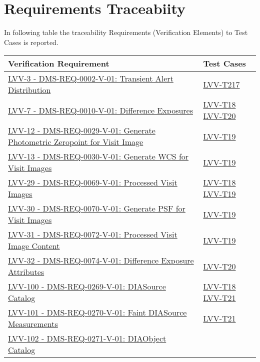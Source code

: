 \section{Requirements Traceabiity}\label{requirements-traceability}

In following table the traceability Requirements (Verification Elements) to Test Cases is reported.

\scriptsize{\begin{longtable}[]{p{13cm}p{3cm}}
\toprule 
Verification Requirement & Test Cases\tabularnewline
\midrule
\endhead \href{https://jira.lsstcorp.org/browse/LVV-3}{ LVV-3 - DMS-REQ-0002-V-01: Transient Alert Distribution } & 
{ \hyperref[lvv-t217]{LVV-T217}} \\ 
 \href{https://jira.lsstcorp.org/browse/LVV-7}{ LVV-7 - DMS-REQ-0010-V-01: Difference Exposures } & 
{ \hyperref[lvv-t18]{LVV-T18} \hyperref[lvv-t20]{LVV-T20}} \\ 
 \href{https://jira.lsstcorp.org/browse/LVV-12}{ LVV-12 - DMS-REQ-0029-V-01: Generate Photometric Zeropoint for Visit Image } & 
{ \hyperref[lvv-t19]{LVV-T19}} \\ 
 \href{https://jira.lsstcorp.org/browse/LVV-13}{ LVV-13 - DMS-REQ-0030-V-01: Generate WCS for Visit Images } & 
{ \hyperref[lvv-t19]{LVV-T19}} \\ 
 \href{https://jira.lsstcorp.org/browse/LVV-29}{ LVV-29 - DMS-REQ-0069-V-01: Processed Visit Images } & 
{ \hyperref[lvv-t18]{LVV-T18} \hyperref[lvv-t19]{LVV-T19}} \\ 
 \href{https://jira.lsstcorp.org/browse/LVV-30}{ LVV-30 - DMS-REQ-0070-V-01: Generate PSF for Visit Images } & 
{ \hyperref[lvv-t19]{LVV-T19}} \\ 
 \href{https://jira.lsstcorp.org/browse/LVV-31}{ LVV-31 - DMS-REQ-0072-V-01: Processed Visit Image Content } & 
{ \hyperref[lvv-t19]{LVV-T19}} \\ 
 \href{https://jira.lsstcorp.org/browse/LVV-32}{ LVV-32 - DMS-REQ-0074-V-01: Difference Exposure Attributes } & 
{ \hyperref[lvv-t20]{LVV-T20}} \\ 
 \href{https://jira.lsstcorp.org/browse/LVV-100}{ LVV-100 - DMS-REQ-0269-V-01: DIASource Catalog } & 
{ \hyperref[lvv-t18]{LVV-T18} \hyperref[lvv-t21]{LVV-T21}} \\ 
 \href{https://jira.lsstcorp.org/browse/LVV-101}{ LVV-101 - DMS-REQ-0270-V-01: Faint DIASource Measurements } & 
{ \hyperref[lvv-t21]{LVV-T21}} \\ 
 \href{https://jira.lsstcorp.org/browse/LVV-102}{ LVV-102 - DMS-REQ-0271-V-01: DIAObject Catalog } & 

\end{longtable}}
